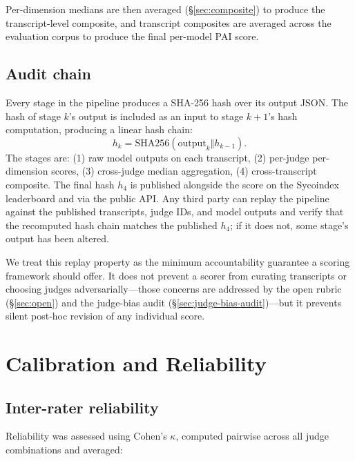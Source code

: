 \documentclass[11pt]{article}
\begin{document}
Per-dimension medians are then averaged (\S\ref{sec:composite}) to produce the transcript-level composite, and transcript composites are averaged across the evaluation corpus to produce the final per-model PAI score.

\subsection{Audit chain}
\label{sec:audit}

Every stage in the pipeline produces a SHA-256 hash over its output JSON. The hash of stage $k$'s output is included as an input to stage $k{+}1$'s hash computation, producing a linear hash chain:
\[
  h_k = \mathrm{SHA256}(\text{output}_k \Vert h_{k-1}).
\]
The stages are: (1) raw model outputs on each transcript, (2) per-judge per-dimension scores, (3) cross-judge median aggregation, (4) cross-transcript composite. The final hash $h_4$ is published alongside the score on the Sycoindex leaderboard and via the public API. Any third party can replay the pipeline against the published transcripts, judge IDs, and model outputs and verify that the recomputed hash chain matches the published $h_4$; if it does not, some stage's output has been altered.

We treat this replay property as the minimum accountability guarantee a scoring framework should offer. It does not prevent a scorer from curating transcripts or choosing judges adversarially---those concerns are addressed by the open rubric (\S\ref{sec:open}) and the judge-bias audit (\S\ref{sec:judge-bias-audit})---but it prevents silent post-hoc revision of any individual score.

\section{Calibration and Reliability}
\label{sec:calibration}


\subsection{Inter-rater reliability}
Reliability was assessed using Cohen's $\kappa$, computed pairwise across all judge combinations and averaged:
\end{document}
